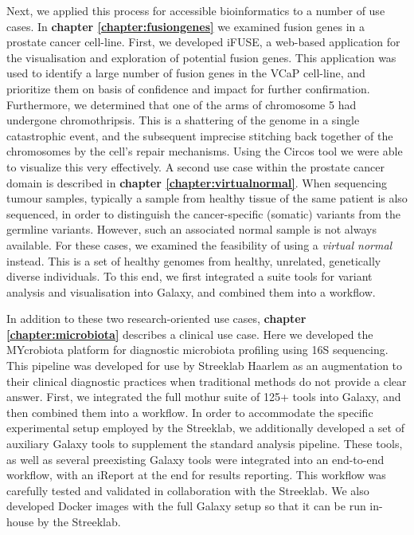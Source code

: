 Next, we applied this process for accessible bioinformatics to a number of use cases. In \textbf{chapter \ref{chapter:fusiongenes}} we examined fusion genes in a prostate cancer cell-line. First, we developed iFUSE, a web-based application for the visualisation and exploration of potential fusion genes. This application was used to identify a large number of fusion genes in the VCaP cell-line, and prioritize them on basis of confidence and impact for further confirmation. Furthermore, we determined that one of the arms of chromosome 5 had undergone chromothripsis. This is a shattering of the genome in a single catastrophic event, and the subsequent imprecise stitching back together of the chromosomes by the cell's repair mechanisms. Using the Circos tool we were able to visualize this very effectively.
A second use case within the prostate cancer domain is described in \textbf{chapter \ref{chapter:virtualnormal}}. When sequencing tumour samples, typically a sample from healthy tissue of the same patient is also sequenced, in order to distinguish the cancer-specific (somatic) variants from the germline variants. However, such an associated normal sample is not always available. For these cases, we examined the feasibility of using a \emph{virtual normal} instead. This is a set of healthy genomes from healthy, unrelated, genetically diverse individuals. To this end, we first integrated a suite tools for variant analysis and visualisation into Galaxy, and combined them into a workflow.

In addition to these two research-oriented use cases, \textbf{chapter \ref{chapter:microbiota}} describes a clinical use case. Here we developed the MYcrobiota platform for diagnostic microbiota profiling using 16S sequencing. This pipeline was developed for use by Streeklab Haarlem as an augmentation to their clinical diagnostic practices when traditional methods do not provide a clear answer.
First, we integrated the full mothur suite of 125+ tools into Galaxy, and then combined them into a workflow. In order to accommodate the specific experimental setup employed by the Streeklab, we additionally developed a set of auxiliary Galaxy tools to supplement the standard analysis pipeline.
These tools, as well as several preexisting Galaxy tools were integrated into an end-to-end workflow, with an iReport at the end for results reporting. This workflow was carefully tested and validated in collaboration with the Streeklab. We also developed Docker images with the full Galaxy setup so that it can be run in-house by the Streeklab.

